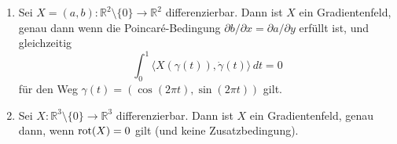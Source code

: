 \documentclass[../main.tex]{subfiles}
\begin{document}
\begin{proposition}\label{prop:low-dimensions}
  \leavevmode
  \begin{enumerate}[\normalfont(i)]
    \item Sei $X = (a, b) \colon \mathbb{R}^2 \setminus \{0\} \to \mathbb{R}^2$
      differenzierbar. Dann ist $X$ ein Gradientenfeld, genau dann wenn
      die Poincaré-Bedingung
      $\partial b / \partial x = \partial a / \partial y$
      erfüllt ist, und gleichzeitig
      \[
        \int_{0}^{1} \langle X(\gamma(t)), \dot \gamma(t) \rangle \, dt = 0
      \]
      für den Weg $\gamma(t) = (\cos(2\pi t), \sin(2 \pi t))$ gilt.
    \item Sei
      $X \colon \mathbb{R}^3 \setminus \{0\} \to \mathbb{R}^3$
      differenzierbar.
      Dann ist $X$ ein Gradientenfeld, genau dann, wenn $\textup{rot}(X) = 0$
      gilt (und keine Zusatzbedingung).
  \end{enumerate}
\end{proposition}
\end{document}
